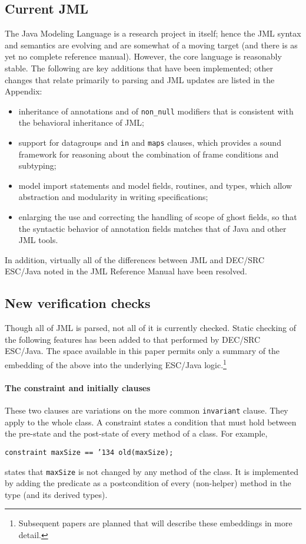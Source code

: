 \documentclass{sig-alternate}
\begin{document}
\subsection{Current JML}
The Java Modeling Language is a research project in itself; hence the
JML syntax and semantics are evolving and are somewhat of a moving
target (and there is as yet no complete reference manual).  However,
the core language is reasonably stable.  The following are key
additions that have been implemented; other changes that relate primarily
to parsing and JML updates are listed in the Appendix:

\setlength{\partopsep}{0in}\setlength{\parskip}{0in}\setlength{\itemsep}{0in}\setlength{\topsep}{0in}
\begin{itemize}
\setlength{\partopsep}{0in}\setlength{\parskip}{0in}\setlength{\itemsep}{0in}\setlength{\topsep}{0in}
\item inheritance of annotations and of \texttt{non\_null}
  modifiers that is consistent with the behavioral inheritance of JML;
\item support for datagroups and \texttt{in} and \texttt{maps} clauses, which provides a sound framework for reasoning about the combination of frame conditions and subtyping;
\item model import statements and model fields, routines, and types, which allow abstraction 
and modularity in writing specifications;
\item enlarging the use and correcting the handling of scope of ghost fields, so that the syntactic behavior 
of annotation fields matches that of Java and other JML tools.
\end{itemize}
In addition, virtually all of the differences between JML and DEC/SRC ESC/Java
noted in the JML Reference Manual have been resolved.

\subsection{New verification checks}
Though all of JML is parsed, not all of it is currently checked.
Static checking of the following features has been added to that performed by
DEC/SRC ESC/Java.  The space available in this paper permits only
a summary of the embedding of the above into the underlying ESC/Java 
logic.\footnote{Subsequent papers are planned that will describe these embeddings in more detail.}  

\paragraph*{The constraint and initially clauses}
These two clauses are variations on the more common \texttt{invariant} clause.  They apply to the whole class.  A constraint states a condition that must hold between the pre-state and the post-state of every method of a class.  For example,
\begin{center}
\texttt{constraint maxSize == \char'134 old(maxSize); }
\end{center}
states that \texttt{maxSize} is not changed by any method of the class.  It is implemented by 
adding the predicate as a postcondition of every (non-helper) method in the type (and its derived types).
\end{document}
